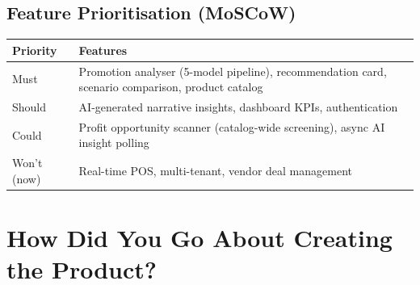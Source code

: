\documentclass[11pt, a4paper]{article}
\begin{document}
\subsection{Feature Prioritisation (MoSCoW)}

\begin{tabularx}{\textwidth}{| l | X |}
    \hline
    \textbf{Priority} & \textbf{Features} \\
    \hline\hline
    Must & Promotion analyser (5-model pipeline), recommendation card, scenario comparison, product catalog \\
    \hline
    Should & AI-generated narrative insights, dashboard KPIs, authentication \\
    \hline
    Could & Profit opportunity scanner (catalog-wide screening), async AI insight polling \\
    \hline
    Won't (now) & Real-time POS, multi-tenant, vendor deal management \\
    \hline
\end{tabularx}


\section{How Did You Go About Creating the Product?}
\end{document}
